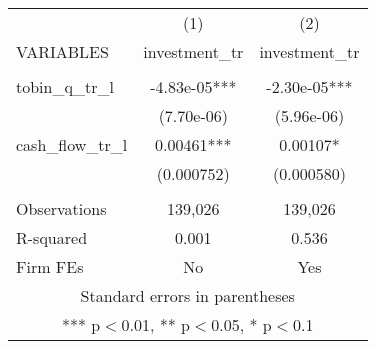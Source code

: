 \begin{tabular}{lcc} \hline
 & (1) & (2) \\
VARIABLES & investment\_tr & investment\_tr \\ \hline
 &  &  \\
tobin\_q\_tr\_l & -4.83e-05*** & -2.30e-05*** \\
 & (7.70e-06) & (5.96e-06) \\
cash\_flow\_tr\_l & 0.00461*** & 0.00107* \\
 & (0.000752) & (0.000580) \\
 &  &  \\
Observations & 139,026 & 139,026 \\
R-squared & 0.001 & 0.536 \\
 Firm FEs & No & Yes \\ \hline
\multicolumn{3}{c}{ Standard errors in parentheses} \\
\multicolumn{3}{c}{ *** p$<$0.01, ** p$<$0.05, * p$<$0.1} \\
\end{tabular}
